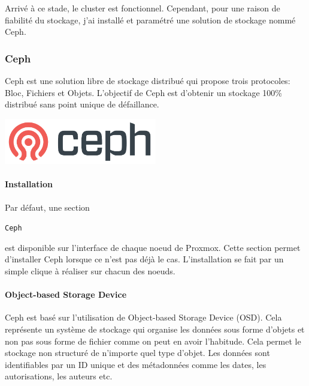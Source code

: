 \documentclass[12pt]{article}
\begin{document}
Arrivé à ce stade, le \gls{cluster} est fonctionnel. 
Cependant, pour une raison de fiabilité du stockage, j'ai installé et paramétré une solution de stockage nommé \gls{Ceph}.

\subsubsection{\gls{Ceph}}
\noindent%
\begin{minipage}{.7\textwidth}%
\gls{Ceph} est une solution libre de stockage distribué qui propose trois protocoles: Bloc, Fichiers et Objets.
L'objectif de \gls{Ceph} est d'obtenir un stockage 100\% distribué sans point unique de défaillance.

\end{minipage}%
\hfill
\begin{minipage}{.3\textwidth}%
\begin{center}
\includegraphics[width=0.5\textwidth]{src/logo_ceph.png}
\end{center}
\end{minipage}%

\paragraph{Installation}
Par défaut, une section \begin{code}\texttt{\gls{Ceph}}\end{code} est disponible sur l'interface de chaque noeud de \gls{Proxmox}. 
Cette section permet d'installer \gls{Ceph} lorsque ce n'est pas déjà le cas.
L'installation se fait par un simple clique à réaliser sur chacun des noeuds.

\paragraph{Object-based Storage Device}
\gls{Ceph} est basé sur l'utilisation de Object-based Storage Device (\gls{OSD}).
Cela représente un système de stockage qui organise les données sous forme d'objets et non pas sous forme de fichier comme on peut en avoir l'habitude.
Cela permet le stockage non structuré de n'importe quel type d'objet.
Les données sont identifiables par un ID unique et des métadonnées comme les dates, les autorisations, les auteurs etc.
\end{document}
